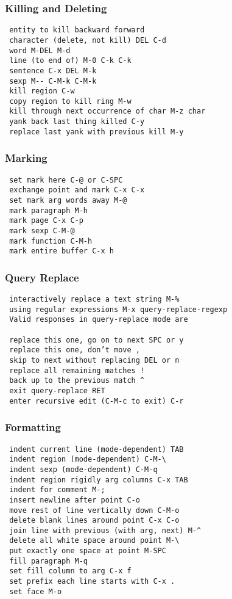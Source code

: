 \subsubsection{Killing and Deleting}

\begin{lstlisting}
 entity to kill backward forward
 character (delete, not kill) DEL C-d
 word M-DEL M-d
 line (to end of) M-0 C-k C-k
 sentence C-x DEL M-k
 sexp M-- C-M-k C-M-k
 kill region C-w
 copy region to kill ring M-w
 kill through next occurrence of char M-z char
 yank back last thing killed C-y
 replace last yank with previous kill M-y
\end{lstlisting}

\subsubsection{Marking}

\begin{lstlisting}
 set mark here C-@ or C-SPC
 exchange point and mark C-x C-x
 set mark arg words away M-@
 mark paragraph M-h
 mark page C-x C-p
 mark sexp C-M-@
 mark function C-M-h
 mark entire buffer C-x h
\end{lstlisting}

\subsubsection{Query Replace}

\begin{lstlisting}
 interactively replace a text string M-%
 using regular expressions M-x query-replace-regexp
 Valid responses in query-replace mode are

 replace this one, go on to next SPC or y
 replace this one, don’t move ,
 skip to next without replacing DEL or n
 replace all remaining matches !
 back up to the previous match ^
 exit query-replace RET
 enter recursive edit (C-M-c to exit) C-r
\end{lstlisting}

\subsubsection{Formatting}

\begin{lstlisting}
 indent current line (mode-dependent) TAB
 indent region (mode-dependent) C-M-\
 indent sexp (mode-dependent) C-M-q
 indent region rigidly arg columns C-x TAB
 indent for comment M-;
 insert newline after point C-o
 move rest of line vertically down C-M-o
 delete blank lines around point C-x C-o
 join line with previous (with arg, next) M-^
 delete all white space around point M-\
 put exactly one space at point M-SPC
 fill paragraph M-q
 set fill column to arg C-x f
 set prefix each line starts with C-x .
 set face M-o
\end{lstlisting}

